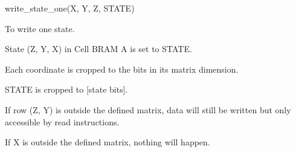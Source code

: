 

\format
write\_state\_one(X, Y, Z, STATE)

\purpose

To write one state.

\description

State (Z, Y, X) in Cell BRAM A is set to STATE.

\notes

Each coordinate is cropped to the bits in its matrix dimension.

STATE is cropped to [state bits].

If row (Z, Y) is outside the defined matrix, data will still be written but only accessible by read instructions.

If X is outside the defined matrix, nothing will happen.
